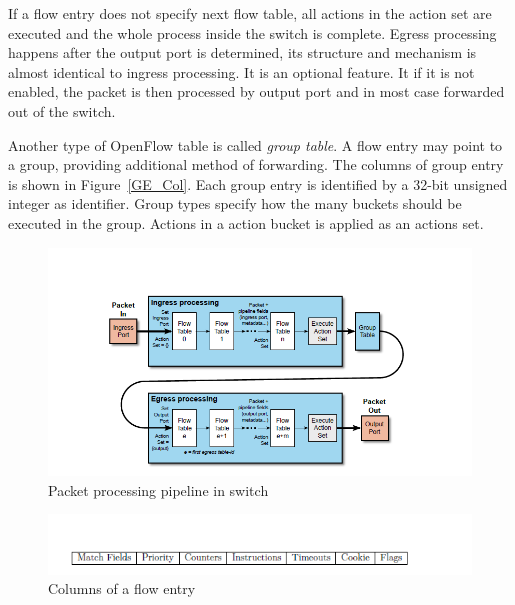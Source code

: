 If a flow entry does not specify next flow table, all actions in the action set are executed and the whole process inside the switch is complete. Egress processing happens after the output port is determined, its structure and mechanism is almost identical to ingress processing. It is an optional feature. It if it is not enabled, the packet is then processed by output port and in most case forwarded out of the switch. \cite{OF_SPEC}

Another type of OpenFlow table is called \textit{group table}. A flow entry may point to a group, providing additional method of forwarding. The columns of group entry is shown in Figure~\ref{GE_Col}. Each group entry is identified by a 32-bit unsigned integer as identifier. Group types specify how the many buckets should be executed in the group. Actions in a action bucket is applied as an actions set.

\begin{figure}[H]
\begin{center} 
\includegraphics[width=1.2\textwidth]{figures/packet_flow_thru_processing_pipeline.png}
\end{center}
\caption{Packet processing pipeline in switch}
\label{PPPIS}
\end{figure}

\begin{figure}[H]
\begin{center} 
\includegraphics[width=1\textwidth]{figures/columns_of_flow_entry.png}
\end{center}
\caption{Columns of a flow entry}
\label{FE_Col}
\end{figure}

